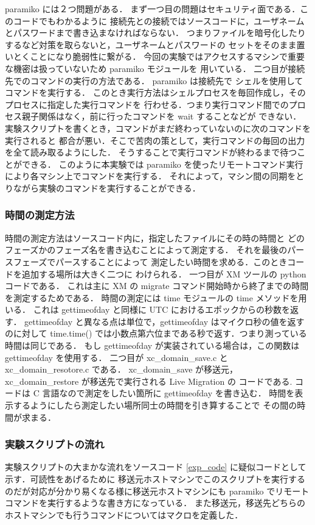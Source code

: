 \documentclass[graduation-thesis]{mlarticle}
\begin{document}
paramiko には２つ問題がある．
まず一つ目の問題はセキュリティ面である．このコードでもわかるように
接続先との接続ではソースコードに，ユーザネームとパスワードまで書き込まなければならない．
つまりファイルを暗号化したりするなど対策を取らないと，ユーザネームとパスワードの
セットをそのまま置いとくことになり脆弱性に繋がる．
今回の実験ではアクセスするマシンで重要な機密は扱っていないため paramiko モジュールを
用いている．
二つ目が接続先でのコマンドの実行の方法である．
paramiko は接続先で シェルを使用してコマンドを実行する．
このとき実行方法はシェルプロセスを毎回作成し，そのプロセスに指定した実行コマンドを
行わせる．つまり実行コマンド間でのプロセス親子関係はなく，前に行ったコマンドを wait することなどが
できない．
実験スクリプトを書くとき，コマンドがまだ終わっていないのに次のコマンドを実行されると
都合が悪い．そこで苦肉の策として，実行コマンドの毎回の出力を全て読み取るようにした．
そうすることで実行コマンドが終わるまで待つことができる．
このように本実験では paramiko を使ったリモートコマンド実行により各マシン上でコマンドを実行する．
それによって，マシン間の同期をとりながら実験のコマンドを実行することができる．

\subsubsection{時間の測定方法}
\label{sec-6-2-2}
時間の測定方法はソースコード内に，指定したファイルにその時の時間と
どのフェーズかのフェーズ名を書き込むことによって測定する．
それを最後のパースフェーズでパースすることによって
測定したい時間を求める．このときコードを追加する場所は大きく二つに
わけられる．
一つ目が XM ツールの python コードである．
これは主に XM の migrate コマンド開始時から終了までの時間を測定するためである．
時間の測定には time モジュールの time メソッドを用いる．
これは gettimeofday と同様に UTC におけるエポックからの秒数を返す．
gettimeofday と異なる点は単位で，gettimeofday はマイクロ秒の値を返すのに対して
time.time() では小数点第六位まである秒で返す．つまり測っている時間は同じである．
もし gettimeofday が実装されている場合は，この関数は gettimeofday を使用する．
二つ目が xc\_domain\_save.c と xc\_domain\_resotore.c である．
xc\_domain\_save が移送元，xc\_domain\_restore が移送先で実行される Live Migration の
コードである. コードは C 言語なので測定をしたい箇所に gettimeofday を書き込む．
時間を表示するようにしたら測定したい場所同士の時間を引き算することで
その間の時間が求まる．

\subsubsection{実験スクリプトの流れ}
\label{sec-6-2-3}
実験スクリプトの大まかな流れをソースコード \ref{exp_code} に疑似コードとして
示す．可読性をあげるために
移送元ホストマシンでこのスクリプトを実行するのだが対応が分かり易くなる様に移送元ホストマシンにも
paramiko でリモートコマンドを実行するような書き方になっている．
また移送元，移送先どちらのホストマシンでも行うコマンドについてはマクロを定義した．
\end{document}
